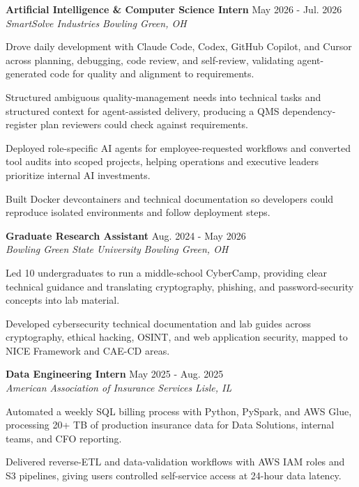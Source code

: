 \documentclass[letterpaper,11pt]{article}
\newcommand{\resumeSubheading}[4]{
  \textbf{#1} \hfill #2\\
  \textit{#3} \hfill \textit{#4}
}
\begin{document}
\resumeSubheading
{Artificial Intelligence \& Computer Science Intern}{May 2026 - Jul. 2026}
{SmartSolve Industries}{Bowling Green, OH}
\begin{tightitemize}
  \item Drove daily development with Claude Code, Codex, GitHub Copilot, and Cursor across planning, debugging, code review, and self-review, validating agent-generated code for quality and alignment to requirements.
  \item Structured ambiguous quality-management needs into technical tasks and structured context for agent-assisted delivery, producing a QMS dependency-register plan reviewers could check against requirements.
  \item Deployed role-specific AI agents for employee-requested workflows and converted tool audits into scoped projects, helping operations and executive leaders prioritize internal AI investments.
  \item Built Docker devcontainers and technical documentation so developers could reproduce isolated environments and follow deployment steps.
\end{tightitemize}

\resumeSubheading
{Graduate Research Assistant}{Aug. 2024 - May 2026}
{Bowling Green State University}{Bowling Green, OH}
\begin{tightitemize}
  \item Led 10 undergraduates to run a middle-school CyberCamp, providing clear technical guidance and translating cryptography, phishing, and password-security concepts into lab material.
  \item Developed cybersecurity technical documentation and lab guides across cryptography, ethical hacking, OSINT, and web application security, mapped to NICE Framework and CAE-CD areas.
\end{tightitemize}

\resumeSubheading
{Data Engineering Intern}{May 2025 - Aug. 2025}
{American Association of Insurance Services}{Lisle, IL}
\begin{tightitemize}
  \item Automated a weekly SQL billing process with Python, PySpark, and AWS Glue, processing 20+ TB of production insurance data for Data Solutions, internal teams, and CFO reporting.
  \item Delivered reverse-ETL and data-validation workflows with AWS IAM roles and S3 pipelines, giving users controlled self-service access at 24-hour data latency.
\end{tightitemize}
\end{document}
